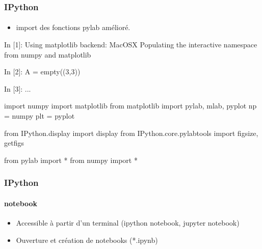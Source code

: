 \begin{frame}[fragile]
\frametitle{IPython}
\framesubtitle{}
\begin{itemize}
 \item import des fonctions pylab amélioré. 
\end{itemize}

\begin{pythonConsole}
In [1]: %
Using matplotlib backend: MacOSX
Populating the interactive namespace from numpy and matplotlib

In [2]: A = empty((3,3))

In [3]: %
...

    import numpy
    import matplotlib
    from matplotlib import pylab, mlab, pyplot
    np = numpy
    plt = pyplot

    from IPython.display import display
    from IPython.core.pylabtools import figsize, getfigs

    from pylab import *
    from numpy import *
\end{pythonConsole}
\end{frame}
\begin{frame}[fragile]
\frametitle{IPython}
\framesubtitle{notebook}
\begin{itemize}
 \item Accessible à partir d'un terminal (ipython notebook, jupyter notebook) 
 \item Ouverture et création de notebooks (*.ipynb)
\end{itemize}
\begin{center}
\end{center}
\end{frame}
